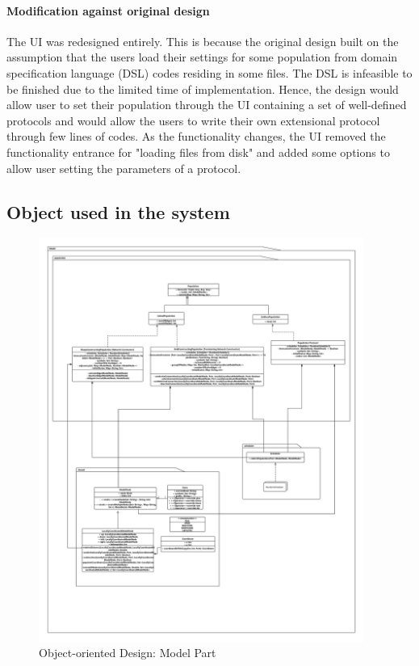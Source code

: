 \paragraph{Modification against original design}
The UI was redesigned entirely. This is because the original design built on the assumption
that the users load their settings for some population from domain specification language (DSL) codes residing in
some files. The DSL is infeasible to be finished due to the limited time of implementation.
Hence, the design would allow user to set their population through the UI containing a set of well-defined
protocols and would allow the users to write their own extensional protocol through few lines of codes.
As the functionality changes, the UI removed the functionality entrance for "loading files from disk" and
added some options to allow user setting the parameters of a protocol.

\subsection{Object used in the system}
\FloatBarrier
\begin{figure}[H]
\begin{center}
\includegraphics[width =0.95\textwidth]{context/diagram/uml_model.pdf}
\caption{Object-oriented Design: Model Part}
\label{oomG}
\end{center}
\end{figure}
